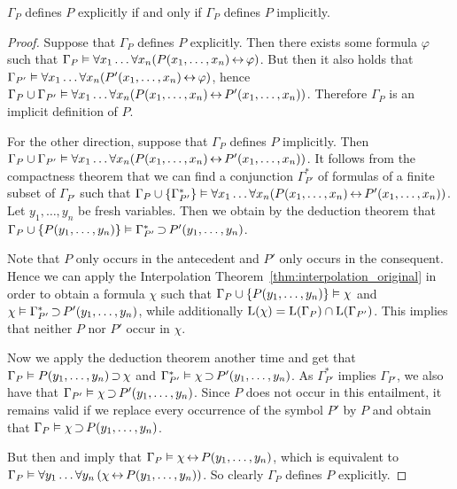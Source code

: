 \begin{thm}
	$\Gamma_P$ defines $P$ explicitly if and only if $\Gamma_P$ defines $P$ implicitly.
\end{thm}
\begin{proof}
	Suppose that $\Gamma_P$ defines $P$ explicitly. 
	Then there exists some formula $\varphi$ such that 
	$\Gamma_P\vDash \forall x_1\dots \forall x_n (  P(x_1, \dots, x_n) \operatorname{\leftrightarrow} \varphi)$.
	But then it also holds that 
	$\Gamma_{P'}\vDash \forall x_1\dots \forall x_n (  P'(x_1, \dots, x_n) \operatorname{\leftrightarrow} \varphi)$, hence
	$\Gamma_{P} \cup \Gamma_{P'} \vDash \forall x_1\dots \forall x_n (P(x_1, \dots, x_n) \operatorname{\leftrightarrow} P'(x_1, \dots, x_n))$.
	Therefore $\Gamma_P$ is an implicit definition of $P$.

	For the other direction, suppose that $\Gamma_P$ defines $P$ implicitly. 
	Then
	$\Gamma_P \cup \Gamma_{P'} \vDash\allowbreak \forall x_1\dots \forall x_n (  P(x_1, \dots, x_n) \operatorname{\leftrightarrow} P'(x_1, \dots, x_n))$.
	It follows from the compactness theorem that
	we can find a conjunction $\Gamma^*_{P'}$ of formulas of a finite subset of $\Gamma_{P'}$ such that  
	$\Gamma_P \cup \{\Gamma^*_{P'}\} \vDash \forall x_1\dots \forall x_n (  P(x_1, \dots, x_n) \operatorname{\leftrightarrow} P'(x_1, \dots, x_n))$.
	Let $y_1, \dots, y_n$ be fresh variables.
	Then we obtain by the deduction theorem that  
	$\Gamma_P \cup \{P(y_1, \dots, y_n)\} \vDash \Gamma^*_{P'} \operatorname{\supset}  P'(y_1, \dots, y_n)$.

	Note that $P$ only occurs in the antecedent and $P'$ only occurs in the consequent.
	Hence we can apply the Interpolation Theorem~\ref{thm:interpolation_original} in order to obtain a formula $\chi$
	such that
	$\Gamma_P \cup \{P(y_1, \dots, y_n)\} \vDash \chi$ and
	$\chi \vDash \Gamma^*_{P'} \operatorname{\supset}  P'(y_1, \dots, y_n)$,
	while additionally $\operatorname{L}(\chi) = \operatorname{L}(\Gamma_P) \cap \operatorname{L}(\Gamma_{P'})$. This implies that neither $P$ nor $P'$ occur in\nolinebreak{} $\chi$.

	Now we apply the deduction theorem another time and get that
	\markA{} $\Gamma_P \vDash P(y_1, \dots, y_n) \operatorname{\supset} \chi$ and
	$\Gamma^*_{P'} \vDash \chi \operatorname{\supset}  P'(y_1, \dots, y_n)$.
	As $\Gamma^*_{P'}$ implies $\Gamma_{P'}$, we also have that
	$\Gamma_{P'} \vDash \chi \operatorname{\supset}  P'(y_1, \dots, y_n)$.
	Since $P$ does not occur in this entailment, it remains valid if we replace every occurrence of the symbol $P'$ by $P$
	and obtain that
	\markB{} $\Gamma_{P} \vDash \chi \operatorname{\supset}  P(y_1, \dots, y_n)$.

	But then \markA{} and \markB{} imply that 
	$\Gamma_{P} \vDash \chi \operatorname{\leftrightarrow}  P(y_1, \dots, y_n)$, which is equivalent to
	$\Gamma_{P} \vDash \forall y_1\dots\forall y_n \left( \chi \operatorname{\leftrightarrow}  P(y_1, \dots, y_n)\right)$.
	So clearly $\Gamma_P$ defines $P$ explicitly.
\end{proof}




